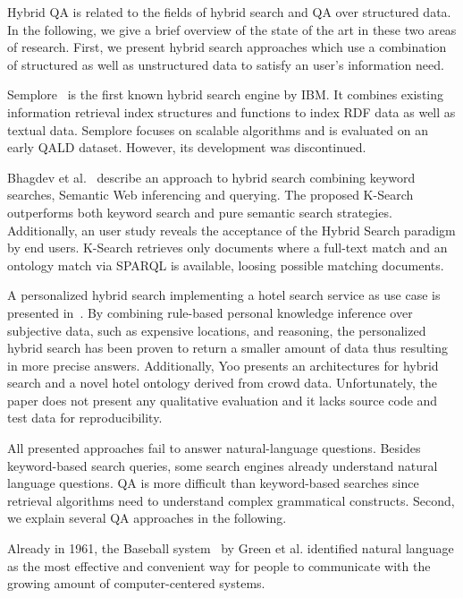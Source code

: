 Hybrid \ac{QA} is related to the fields of hybrid search and \ac{QA} over structured data. 
In the following, we give a brief overview of the state of the art in these two areas of research.
First, we present hybrid search approaches which use a combination of structured as well as unstructured data to satisfy an user's information need. 

\bigskip

Semplore~\cite{Zhang:2007a} is the first known hybrid search engine by IBM.
It combines existing information retrieval index structures and functions to index \ac{RDF} data as well as textual data. 
Semplore focuses on scalable algorithms and is evaluated on an early \ac{QALD} dataset.
However, its development was discontinued.

Bhagdev et al.~\cite{Bhagdev:2008:HSE} describe an approach to hybrid search combining keyword searches, Semantic Web inferencing and querying. 
The proposed K-Search outperforms both keyword search and pure semantic search strategies.
Additionally, an user study reveals the acceptance of the Hybrid Search paradigm by end users.
K-Search retrieves only documents where a full-text match and an ontology match via SPARQL is available, loosing possible matching documents.

A personalized hybrid search implementing a hotel search service as use case is presented in~\cite{DBLP:journals/kbs/Yoo12}. 
By combining rule-based personal knowledge inference over subjective data, such as expensive locations, and reasoning, the personalized hybrid search has been proven to return a smaller amount of data thus resulting in more precise answers. 
Additionally, Yoo presents an architectures for hybrid search and a novel hotel ontology derived from crowd data. 
Unfortunately, the paper does not present any qualitative evaluation and it lacks source code and test data for reproducibility. 

All presented approaches fail to answer natural-language questions.
Besides keyword-based search queries, some search engines already understand natural language questions. \ac{QA} is more difficult than keyword-based searches since retrieval algorithms need to understand complex grammatical constructs.
Second, we explain several \ac{QA} approaches in the following.

Already in 1961, the Baseball system~\cite{green1961baseball} by Green et al. identified natural language as the most effective and convenient way for people to communicate with the growing amount of computer-centered systems. 

